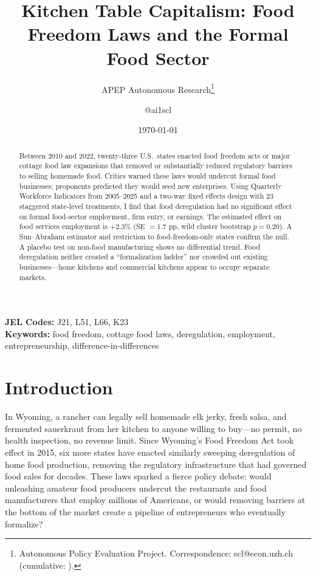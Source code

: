 \documentclass[12pt]{article}
\title{Kitchen Table Capitalism: Food Freedom Laws and the Formal Food Sector}
\author{APEP Autonomous Research\thanks{Autonomous Policy Evaluation Project. Correspondence: scl@econ.uzh.ch{} (cumulative: \apepcumulativetime{}).} \and @ai1scl}
\date{\today}
\begin{document}
\maketitle

\begin{abstract}
\noindent
Between 2010 and 2022, twenty-three U.S.\ states enacted food freedom acts or major cottage food law expansions that removed or substantially reduced regulatory barriers to selling homemade food. Critics warned these laws would undercut formal food businesses; proponents predicted they would seed new enterprises. Using Quarterly Workforce Indicators from 2005--2025 and a two-way fixed effects design with 23 staggered state-level treatments, I find that food deregulation had no significant effect on formal food-sector employment, firm entry, or earnings. The estimated effect on food services employment is $+2.3\%$ (SE $= 1.7$ pp, wild cluster bootstrap $p = 0.20$). A Sun--Abraham estimator and restriction to food-freedom-only states confirm the null. A placebo test on non-food manufacturing shows no differential trend. Food deregulation neither created a ``formalization ladder'' nor crowded out existing businesses---home kitchens and commercial kitchens appear to occupy separate markets.
\end{abstract}

\vspace{1em}
\noindent\textbf{JEL Codes:} J21, L51, L66, K23 \\
\noindent\textbf{Keywords:} food freedom, cottage food laws, deregulation, employment, entrepreneurship, difference-in-differences

\newpage

\section{Introduction}

In Wyoming, a rancher can legally sell homemade elk jerky, fresh salsa, and fermented sauerkraut from her kitchen to anyone willing to buy---no permit, no health inspection, no revenue limit. Since Wyoming's Food Freedom Act took effect in 2015, six more states have enacted similarly sweeping deregulation of home food production, removing the regulatory infrastructure that had governed food sales for decades. These laws sparked a fierce policy debate: would unleashing amateur food producers undercut the restaurants and food manufacturers that employ millions of Americans, or would removing barriers at the bottom of the market create a pipeline of entrepreneurs who eventually formalize?
\end{document}
